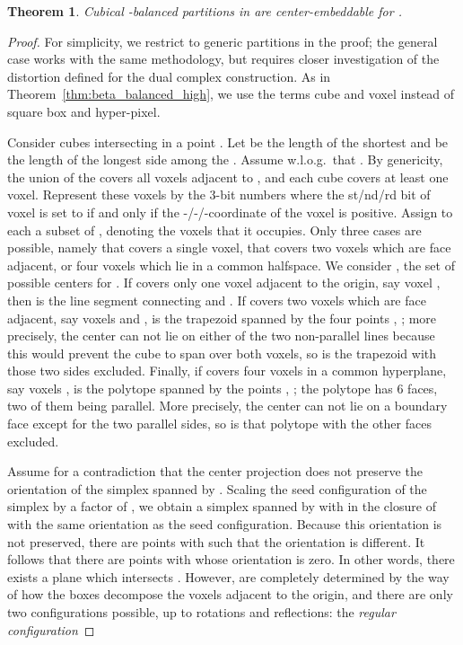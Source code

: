 \documentclass[12pt]{article}
\newtheorem{theorem}{Theorem}
\begin{document}
\begin{theorem}\label{thm:cubical_partition_bound_3d}
Cubical -balanced partitions in  
are center-embeddable for .
\end{theorem}
\begin{proof}
For simplicity, we restrict to generic partitions in the proof; the 
general case works with the same methodology, but requires closer
investigation of the distortion defined for the dual complex construction.
As in Theorem~\ref{thm:beta_balanced_high}, 
we use the terms cube and voxel instead of square box and hyper-pixel.

Consider  cubes  intersecting in a point .
Let  be the length of the shortest and  be the length of the longest
side among the . 
Assume w.l.o.g.\ that . By genericity, the union of the  covers all
 voxels adjacent to , and each cube covers at least one voxel.
Represent these voxels by the 3-bit numbers  where the 
st/nd/rd bit of voxel  is set to  if and only if the 
-/-/-coordinate of the voxel is positive. 
Assign to each  a subset of
, denoting the voxels that it occupies.
Only three cases are possible, namely that 
covers a single voxel, that  covers two voxels which are face adjacent,
or four voxels which lie in a common halfspace.
We consider , the set of possible centers for .
If  covers only one voxel
adjacent to the origin, say voxel , then 
is the line segment connecting 
and . If  covers two voxels which are face adjacent,
say voxels  and ,  is the trapezoid
spanned by the four points , ; 
more precisely, the center can not
lie on either of the two non-parallel lines because this would prevent
the cube to span over both voxels, so  is the trapezoid with those
two sides excluded.
Finally, if  covers four voxels in a common hyperplane, say
voxels ,  is the polytope spanned by
the  points , ;
the polytope has 6 faces, two
of them being parallel.
More precisely, the center can not lie on a boundary face except for the
two parallel sides, so  is that polytope with 
the other  faces excluded.

Assume for a contradiction that the center projection does not preserve
the orientation of the simplex spanned by .
Scaling the seed configuration of the simplex by a factor of , 
we obtain a simplex spanned by  with  in the closure
of  with the same orientation as the seed configuration. Because
this orientation is not preserved, there are points 
with  such that the orientation is different. It follows
that there are points  with
 whose orientation is zero. In other words, there exists
a plane which intersects .
However,  are completely determined
by the way of how the boxes  decompose the voxels 
adjacent to the origin, and there are only two configurations possible,
up to rotations and reflections:
the \emph{regular configuration}


\end{proof}
\end{document}
